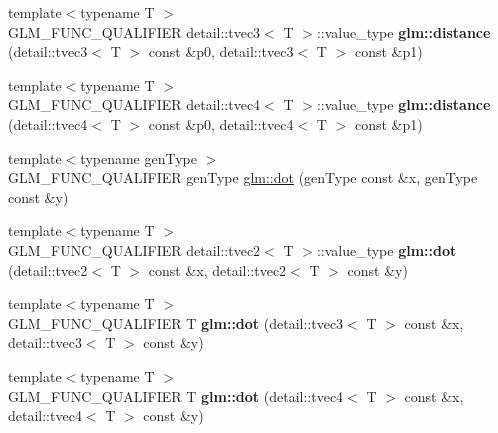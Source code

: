 \begin{DoxyCompactItemize}
\item 
\hypertarget{namespaceglm_a703b08cc8cd10426eb3885f4a9778706}{}{\footnotesize template$<$typename T $>$ }\\G\+L\+M\+\_\+\+F\+U\+N\+C\+\_\+\+Q\+U\+A\+L\+I\+F\+I\+E\+R detail\+::tvec3$<$ T $>$\+::value\+\_\+type {\bfseries glm\+::distance} (detail\+::tvec3$<$ T $>$ const \&p0, detail\+::tvec3$<$ T $>$ const \&p1)\label{namespaceglm_a703b08cc8cd10426eb3885f4a9778706}

\item 
\hypertarget{namespaceglm_aba6ad5ff80b3e5400708fea100bf8a76}{}{\footnotesize template$<$typename T $>$ }\\G\+L\+M\+\_\+\+F\+U\+N\+C\+\_\+\+Q\+U\+A\+L\+I\+F\+I\+E\+R detail\+::tvec4$<$ T $>$\+::value\+\_\+type {\bfseries glm\+::distance} (detail\+::tvec4$<$ T $>$ const \&p0, detail\+::tvec4$<$ T $>$ const \&p1)\label{namespaceglm_aba6ad5ff80b3e5400708fea100bf8a76}

\item 
{\footnotesize template$<$typename gen\+Type $>$ }\\G\+L\+M\+\_\+\+F\+U\+N\+C\+\_\+\+Q\+U\+A\+L\+I\+F\+I\+E\+R gen\+Type \hyperlink{group__core__func__geometric_ga05244a4e222740e5e38abe91fc51df79}{glm\+::dot} (gen\+Type const \&x, gen\+Type const \&y)
\item 
\hypertarget{namespaceglm_ae022826ddafad29a7a410455a905a0d6}{}{\footnotesize template$<$typename T $>$ }\\G\+L\+M\+\_\+\+F\+U\+N\+C\+\_\+\+Q\+U\+A\+L\+I\+F\+I\+E\+R detail\+::tvec2$<$ T $>$\+::value\+\_\+type {\bfseries glm\+::dot} (detail\+::tvec2$<$ T $>$ const \&x, detail\+::tvec2$<$ T $>$ const \&y)\label{namespaceglm_ae022826ddafad29a7a410455a905a0d6}

\item 
\hypertarget{namespaceglm_a39dbf81749a2043a959bc11ea7810004}{}{\footnotesize template$<$typename T $>$ }\\G\+L\+M\+\_\+\+F\+U\+N\+C\+\_\+\+Q\+U\+A\+L\+I\+F\+I\+E\+R T {\bfseries glm\+::dot} (detail\+::tvec3$<$ T $>$ const \&x, detail\+::tvec3$<$ T $>$ const \&y)\label{namespaceglm_a39dbf81749a2043a959bc11ea7810004}

\item 
\hypertarget{namespaceglm_af9645b5c6e227c570470967c4e716126}{}{\footnotesize template$<$typename T $>$ }\\G\+L\+M\+\_\+\+F\+U\+N\+C\+\_\+\+Q\+U\+A\+L\+I\+F\+I\+E\+R T {\bfseries glm\+::dot} (detail\+::tvec4$<$ T $>$ const \&x, detail\+::tvec4$<$ T $>$ const \&y)\label{namespaceglm_af9645b5c6e227c570470967c4e716126}


\end{DoxyCompactItemize}

